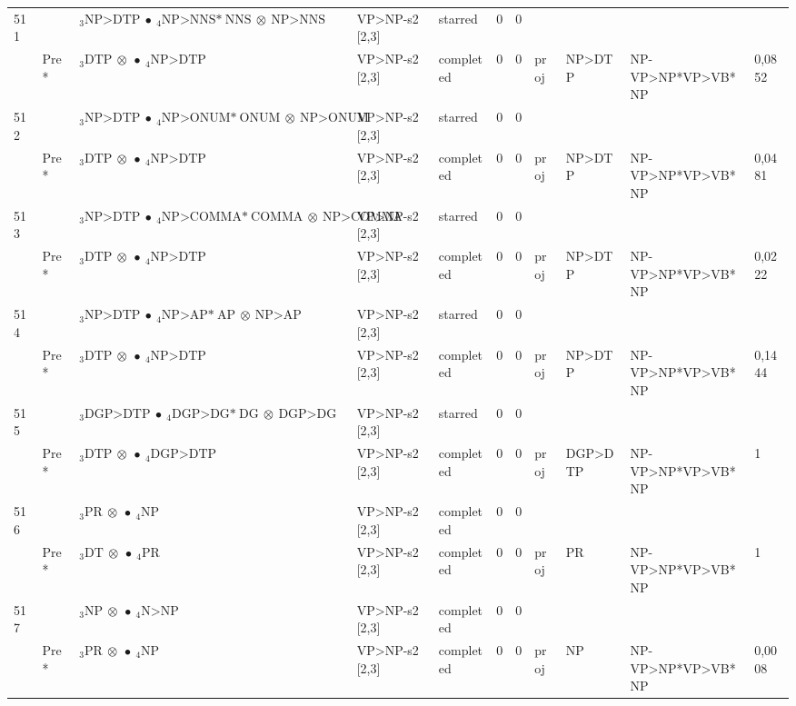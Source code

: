 \documentclass[10pt]{article}
\begin{document}
\begin{longtable}[htbp]{lllllllllll}
511 & & $ {}_3 \textrm{NP>DTP} \  \bullet \ {}_{4} \textrm{NP>NNS*} \ \textrm{NNS} \  \otimes \ \textrm{NP>NNS} $ & VP>NP-s2 [2,3] & starred & 0 & 0 & & & & \\ 
 & Pre *& $ {}_3 \textrm{DTP} \  \otimes \  \bullet \ {}_{4} \textrm{NP>DTP} $ & VP>NP-s2 [2,3] & completed & 0 & 0 & proj & NP>DTP & NP-VP>NP*VP>VB*NP & 0,0852 \\ 
512 & & $ {}_3 \textrm{NP>DTP} \  \bullet \ {}_{4} \textrm{NP>ONUM*} \ \textrm{ONUM} \  \otimes \ \textrm{NP>ONUM} $ & VP>NP-s2 [2,3] & starred & 0 & 0 & & & & \\ 
 & Pre *& $ {}_3 \textrm{DTP} \  \otimes \  \bullet \ {}_{4} \textrm{NP>DTP} $ & VP>NP-s2 [2,3] & completed & 0 & 0 & proj & NP>DTP & NP-VP>NP*VP>VB*NP & 0,0481 \\ 
513 & & $ {}_3 \textrm{NP>DTP} \  \bullet \ {}_{4} \textrm{NP>COMMA*} \ \textrm{COMMA} \  \otimes \ \textrm{NP>COMMA} $ & VP>NP-s2 [2,3] & starred & 0 & 0 & & & & \\ 
 & Pre *& $ {}_3 \textrm{DTP} \  \otimes \  \bullet \ {}_{4} \textrm{NP>DTP} $ & VP>NP-s2 [2,3] & completed & 0 & 0 & proj & NP>DTP & NP-VP>NP*VP>VB*NP & 0,0222 \\ 
514 & & $ {}_3 \textrm{NP>DTP} \  \bullet \ {}_{4} \textrm{NP>AP*} \ \textrm{AP} \  \otimes \ \textrm{NP>AP} $ & VP>NP-s2 [2,3] & starred & 0 & 0 & & & & \\ 
 & Pre *& $ {}_3 \textrm{DTP} \  \otimes \  \bullet \ {}_{4} \textrm{NP>DTP} $ & VP>NP-s2 [2,3] & completed & 0 & 0 & proj & NP>DTP & NP-VP>NP*VP>VB*NP & 0,1444 \\ 
515 & & $ {}_3 \textrm{DGP>DTP} \  \bullet \ {}_{4} \textrm{DGP>DG*} \ \textrm{DG} \  \otimes \ \textrm{DGP>DG} $ & VP>NP-s2 [2,3] & starred & 0 & 0 & & & & \\ 
 & Pre *& $ {}_3 \textrm{DTP} \  \otimes \  \bullet \ {}_{4} \textrm{DGP>DTP} $ & VP>NP-s2 [2,3] & completed & 0 & 0 & proj & DGP>DTP & NP-VP>NP*VP>VB*NP & 1 \\ 
516 & & $ {}_3 \textrm{PR} \  \otimes \  \bullet \ {}_{4} \textrm{NP} $ & VP>NP-s2 [2,3] & completed & 0 & 0 & & & & \\ 
 & Pre *& $ {}_3 \textrm{DT} \  \otimes \  \bullet \ {}_{4} \textrm{PR} $ & VP>NP-s2 [2,3] & completed & 0 & 0 & proj & PR & NP-VP>NP*VP>VB*NP & 1 \\ 
517 & & $ {}_3 \textrm{NP} \  \otimes \  \bullet \ {}_{4} \textrm{N>NP} $ & VP>NP-s2 [2,3] & completed & 0 & 0 & & & & \\ 
 & Pre *& $ {}_3 \textrm{PR} \  \otimes \  \bullet \ {}_{4} \textrm{NP} $ & VP>NP-s2 [2,3] & completed & 0 & 0 & proj & NP & NP-VP>NP*VP>VB*NP & 0,0008 \\ 

\end{longtable}
\end{document}
